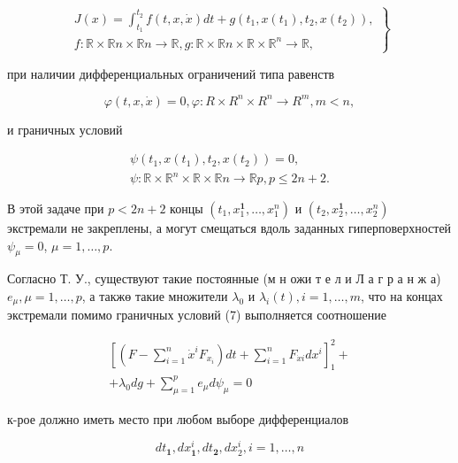 \documentclass[10pt]{article}
\begin{document}
\[

\left.\begin{array}{l}

J(x)=\int_{t_{1}}^{t_{2}} f(t, x, \dot{x}) d t+g\left(t_{1}, x\left(t_{1}\right), t_{2}, x\left(t_{2}\right)\right), \\

f: \mathbb{R} \times \mathbb{R} n \times \mathbb{R} n \rightarrow \mathbb{R}, g: \mathbb{R} \times \mathbb{R} n \times \mathbb{R} \times \mathbb{R}^{n} \rightarrow \mathbb{R},

\end{array}\right\}

\]



при наличии дифференциальных ограничений типа равенств



\[

\varphi(t, x, \dot{x})=0, \varphi: R \times R^{n} \times R^{n} \rightarrow R^{m}, m<n,

\]



и граничных условий



\[

\begin{gathered}

\psi\left(t_{1}, x\left(t_{1}\right), t_{2}, x\left(t_{2}\right)\right)=0, \\

\psi: \mathbb{R} \times \mathbb{R}^{n} \times \mathbb{R} \times \mathbb{R} n \longrightarrow \mathbb{R} p, p \leqslant 2 n+2 .

\end{gathered}

\]



В этой задаче при $p<2 n+2$ концы $\left(t_{1}, x_{1}^{\mathbf{1}}, \ldots, x_{1}^{n}\right)$ и $\left(t_{2}, x_{2}^{\mathbf{1}}, \ldots, x_{2}^{n}\right)$ экстремали не закреплены, а могут смещаться вдоль заданных гиперповерхностей $\psi_{\mu}=0$, $\mu=1, \ldots, p$.



Согласно Т. У., существуют такие постоянные (м н ожи т е л и Л а г р а н ж а) $e_{\mu}, \mu=1, \ldots, p$, а такжө такие множители $\lambda_{0}$ и $\lambda_{i}(t), i=1, \ldots, m$, что на концах экстремали помимо граничных условий (7) выполняется соотношение



\[

\begin{gathered}

{\left[\left(F-\sum_{i=1}^{n} \dot{x}^{i} F_{x_{i}}\right) d t+\sum_{i=1}^{n} F_{\dot{x} i} d x^{i}\right]_{1}^{2}+} \\

+\lambda_{0} d g+\sum_{\mu=1}^{p} e_{\mu} d \psi_{\mu}=0

\end{gathered}

\]



к-рое должно иметь место при любом выборе дифференциалов



\[

d t_{\mathbf{1}}, d x_{\mathbf{1}}^{i}, d t_{\mathbf{2}}, d x_{2}^{i}, i=1, \ldots, n

\]
\end{document}
